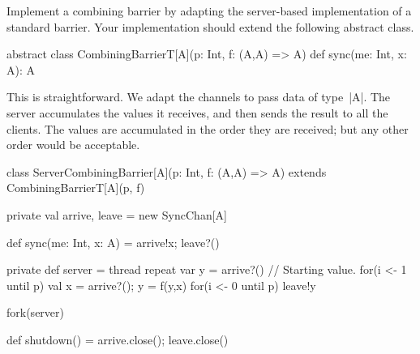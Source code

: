 \begin{questionS}
Implement a combining barrier by adapting the server-based implementation of a
standard barrier.  Your implementation should extend the following abstract
class.   
\begin{scala}
abstract class CombiningBarrierT[A](p: Int, f: (A,A) => A){
  def sync(me: Int, x: A): A
}
\end{scala}
\end{questionS}


\begin{answerS}
This is straightforward.  We adapt the channels to pass data of type~|A|.  The
server accumulates the values it receives, and then sends the result to all
the clients.  The values are accumulated in the order they are received; but
any other order would be acceptable. 
%
\begin{scala}
class ServerCombiningBarrier[A](p: Int, f: (A,A) => A)
    extends CombiningBarrierT[A](p, f){
  private val arrive, leave = new SyncChan[A]

  def sync(me: Int, x: A) = { arrive!x; leave?() }

  private def server = thread{
    repeat{
      var y = arrive?() // Starting value.
      for(i <- 1 until p){ val x = arrive?(); y = f(y,x) }
      for(i <- 0 until p) leave!y
    }
  }

  fork(server)

  def shutdown() = { arrive.close(); leave.close() }
}
\end{scala}
\end{answerS}







